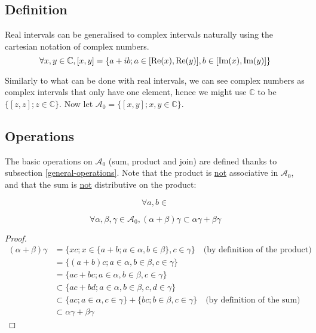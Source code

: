 \subsection{Definition}

Real intervals can be generalised to complex intervals naturally using the cartesian notation of complex numbers.
$$\forall x, y \in \mathbb{C}, [x, y]
= \{a + ib ; a \in [\mathrm{Re}(x), \mathrm{Re}(y)], b \in [\mathrm{Im}(x), \mathrm{Im}(y)]\}$$

Similarly to what can be done with real intervals, we can see complex numbers as complex intervals that only have one element, hence we might use $\mathbb{C}$ to be $\{[z, z] ; z \in \mathbb{C}\}$. Now let $\mathcal{A}_0 = \{[x, y] ; x, y \in \mathbb{C}\}$.

\subsection{Operations}

The basic operations on $\mathcal{A}_0$ (sum, product and join) are defined thanks to subsection \ref{general-operations}. Note that the product is \underline{not} associative in $\mathcal{A}_0$, and that the sum is \underline{not} distributive on the product:

\begin{prop}[growth]
    $$\forall a, b\in$$
\end{prop}

\begin{prop}

    $$\forall \alpha, \beta, \gamma \in \mathcal{A}_0, (\alpha + \beta) \gamma \subset \alpha \gamma + \beta \gamma$$

    \begin{proof}
        \begin{align*}
            (\alpha + \beta)\gamma &= \{xc ; x \in \{a + b ; a \in \alpha, b \in \beta\}, c \in \gamma\} \quad \text{(by definition of the product)}\\
            &= \{(a + b)c ; a \in \alpha, b \in \beta, c \in \gamma\} \\
            &= \{ac + bc ; a \in \alpha, b \in \beta, c \in \gamma\} \\
            &\subset \{ac + bd ; a \in \alpha, b \in \beta, c, d \in \gamma\} \\
            &\subset \{ac; a \in \alpha, c \in \gamma\} + \{bc ; b \in \beta, c \in \gamma\} \quad \text{(by definition of the sum)} \\
            &\subset \alpha \gamma + \beta \gamma
        \end{align*}
    \end{proof}
\end{prop}

